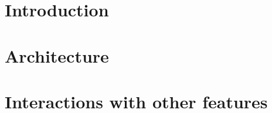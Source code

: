 



\maketitle

\tableofcontents

\chapter{Introduction}


\chapter{Architecture}













\chapter{Interactions with other features}



\printbibliography[heading=bibintoc]

\appendix





